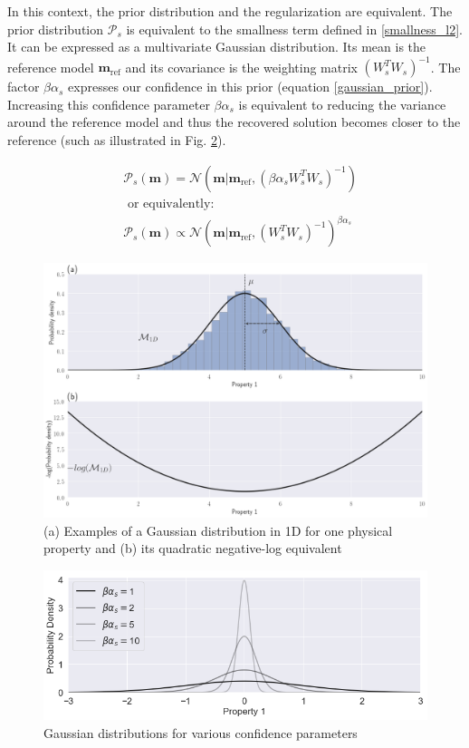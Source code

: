 \documentclass[extra]{gji} %
\begin{document}
In this context, the prior distribution and the regularization are equivalent. The prior distribution $\mathcal{P}_{s}$ is equivalent to the smallness term defined in \ref{smallness_l2}. It can be expressed as a multivariate Gaussian distribution. Its mean is the reference model $\mathbf{m}_{\text{ref}}$ and its covariance is the weighting matrix $(W_s^TW_s)^{-1}$. The factor $\beta \alpha_s$ expresses our confidence in this prior (equation \ref{gaussian_prior}). Increasing this confidence parameter $\beta\alpha_s$ is equivalent to reducing the variance around the reference model and thus the recovered solution becomes closer to the reference (such as illustrated in Fig. \ref{fig:ConfidenceLevel}).

\begin{align}
&\mathcal{P}_{s}(\mathbf{m}) = \mathcal{N}(\mathbf{m}|\mathbf{m}_{\text{ref}}, (\beta\alpha_sW_s^TW_s)^{-1}) \label{gaussian_prior} \\
&\text{ or equivalently: } \nonumber\\
&\mathcal{P}_{s}(\mathbf{m}) \propto \mathcal{N}(\mathbf{m}|\mathbf{m}_{\text{ref}}, (W_s^TW_s)^{-1})^{\beta\alpha_s} \label{gaussian_prior_2}
\end{align}

\begin{figure}
\centering
\includegraphics[width=\columnwidth]{./Fig/LowRes/Gaussian_to_Quadratic_1C.png}
\caption{(a) Examples of a Gaussian distribution in 1D for one physical property and (b) its quadratic negative-log equivalent}
\label{GaussianQuadratic}
\end{figure}

\begin{figure}
\centering
\includegraphics[width=\linewidth]{./Fig/LowRes/Gaussian1D_ConfidenceLevel.png}
\caption[]{Gaussian distributions for various confidence parameters}
\label{fig:ConfidenceLevel}
\end{figure}
\end{document}
